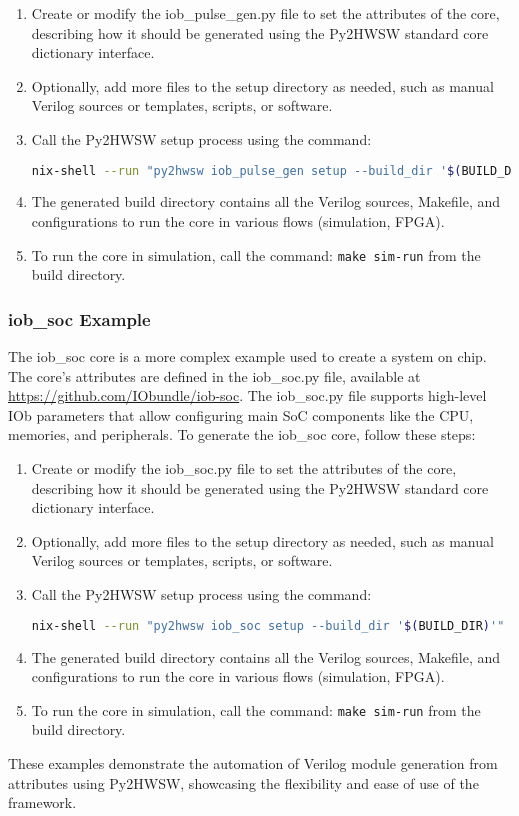 \begin{enumerate}
\item Create or modify the iob\_pulse\_gen.py file to set the attributes of the core, describing how it should be generated using the Py2HWSW standard core dictionary interface.
\item Optionally, add more files to the setup directory as needed, such as manual Verilog sources or templates, scripts, or software.
\item Call the Py2HWSW setup process using the command:
\begin{lstlisting}[language=bash]
nix-shell --run "py2hwsw iob_pulse_gen setup --build_dir '$(BUILD_DIR)'"
\end{lstlisting}
\item The generated build directory contains all the Verilog sources, Makefile, and configurations to run the core in various flows (simulation, FPGA).
\item To run the core in simulation, call the command: \texttt{make sim-run} from the build directory.
\end{enumerate}

\subsubsection{iob\_soc Example}

The iob\_soc core is a more complex example used to create a system on chip. The core's attributes are defined in the iob\_soc.py file, available at \url{https://github.com/IObundle/iob-soc}. The iob\_soc.py file supports high-level IOb parameters that allow configuring main SoC components like the CPU, memories, and peripherals. To generate the iob\_soc core, follow these steps:

\begin{enumerate}
\item Create or modify the iob\_soc.py file to set the attributes of the core, describing how it should be generated using the Py2HWSW standard core dictionary interface.
\item Optionally, add more files to the setup directory as needed, such as manual Verilog sources or templates, scripts, or software.
\item Call the Py2HWSW setup process using the command:
\begin{lstlisting}[language=bash]
nix-shell --run "py2hwsw iob_soc setup --build_dir '$(BUILD_DIR)'"
\end{lstlisting}
\item The generated build directory contains all the Verilog sources, Makefile, and configurations to run the core in various flows (simulation, FPGA).
\item To run the core in simulation, call the command: \texttt{make sim-run} from the build directory.
\end{enumerate}

These examples demonstrate the automation of Verilog module generation from attributes using Py2HWSW, showcasing the flexibility and ease of use of the framework.
